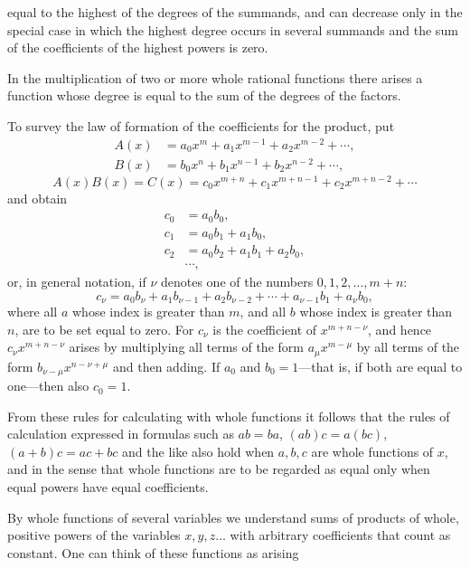 \begingroup
\setlength{\abovedisplayskip}{5pt plus 2pt minus 1pt}
\setlength{\belowdisplayskip}{5pt plus 2pt minus 1pt}
\setlength{\abovedisplayshortskip}{3pt plus 1pt}
\setlength{\belowdisplayshortskip}{4pt plus 1pt}
\linespread{0.94}\selectfont
equal to the highest of the degrees of the summands, and can decrease
only in the special case in which the highest degree occurs in several
summands and the sum of the coefficients of the highest powers is
zero.

In the multiplication of two or more whole rational functions there
arises a function whose degree is equal to the sum of the degrees of
the factors.

To survey the law of formation of the coefficients for the product,
put
\begin{equation}
\begin{aligned}
 A(x)&=a_0x^m+a_1x^{m-1}+a_2x^{m-2}+\cdots,\\
 B(x)&=b_0x^n+b_1x^{n-1}+b_2x^{n-2}+\cdots,
\end{aligned}
\tag{2}
\end{equation}
\begin{equation}
 A(x)B(x)=C(x)=c_0x^{m+n}+c_1x^{m+n-1}+c_2x^{m+n-2}+\cdots
\tag{3}
\end{equation}
and obtain
\[
\begin{aligned}
 c_0&=a_0b_0,\\
 c_1&=a_0b_1+a_1b_0,\\
 c_2&=a_0b_2+a_1b_1+a_2b_0,\\
 &\cdots,
\end{aligned}
\]
or, in general notation, if $\nu$ denotes one of the numbers
$0,1,2,\ldots,m+n$:
\begin{equation}
 c_\nu=a_0b_\nu+a_1b_{\nu-1}+a_2b_{\nu-2}+\cdots
       +a_{\nu-1}b_1+a_\nu b_0,
\tag{4}
\end{equation}
where all $a$ whose index is greater than $m$, and all $b$ whose index
is greater than $n$, are to be set equal to zero. For $c_\nu$ is the
coefficient of $x^{m+n-\nu}$, and hence $c_\nu x^{m+n-\nu}$ arises by
multiplying all terms of the form $a_\mu x^{m-\mu}$ by all terms of the
form $b_{\nu-\mu}x^{n-\nu+\mu}$ and then adding. If $a_0$ and
$b_0=1$---that is, if both are equal to one---then also $c_0=1$.%


From these rules for calculating with whole functions it follows that
the rules of calculation expressed in formulas such as $ab=ba$,
$(ab)c=a(bc)$, $(a+b)c=ac+bc$ and the like also hold when $a,b,c$ are
whole functions of $x$, and in the sense that whole functions are to
be regarded as equal only when equal powers have equal coefficients.

By whole functions of several variables we understand sums of products
of whole, positive powers of the variables $x,y,z\ldots$ with arbitrary
coefficients that count as constant. One can think of these functions
as arising
\endgroup
